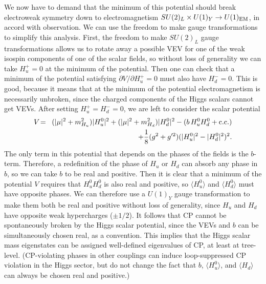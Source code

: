 \documentclass[12pt]{article}
\def\beq{\begin{eqnarray}}
\def\eeq{\end{eqnarray}}
\def\conj{{{\rm c.c.}}}
\begin{document}
We now have to demand that the minimum of this potential should break 
electroweak symmetry down to electromagnetism $SU(2)_L\times U(1)_Y 
\rightarrow U(1)_{\rm EM}$, in accord with observation. We can use the 
freedom to make gauge transformations to simplify this analysis. First, 
the freedom to make $SU(2)_L$ gauge transformations allows us to rotate 
away a possible VEV for one of the weak isospin components of one of the 
scalar fields, so without loss of generality we can take $H_u^+=0$ at the 
minimum of the potential. Then one can check that a minimum of the potential 
satisfying $\partial V/\partial H_u^+=0$ must also have $H_d^- = 0$. This 
is good, because it means that at the minimum of the potential 
electromagnetism is necessarily unbroken, since the charged components of 
the Higgs scalars cannot get VEVs. After setting $H_u^+=H_d^-=0$, we are 
left to consider the scalar potential
\beq
V \!&=&\!
(|\mu|^2 + m^2_{H_u}) |H_u^0|^2 + (|\mu|^2 + m^2_{H_d}) |H_d^0|^2
- (b\, H_u^0 H_d^0 + \conj)
\nonumber \\ && 
+ {1\over 8} (g^2 + g^{\prime 2}) ( |H_u^0|^2 - |H_d^0|^2 )^2 .
\label{littlehiggsv}
\eeq
The only term in this potential that depends on the phases of the fields 
is the $b$-term. Therefore, a redefinition of the phase of $H_u$ or $H_d$ 
can absorb any phase in $b$, so we can take $b$ to be real and positive. 
Then it is clear that a minimum of the potential $V$ requires that $H_u^0 
H_d^0$ is also real and positive, so $\langle H_u^0\rangle$ and $\langle 
H_d^0\rangle$ must have opposite phases. We can therefore use a $U(1)_Y$ 
gauge transformation to make them both be real and positive without loss 
of generality, since $H_u$ and $H_d$ have opposite weak hypercharges ($\pm 
1/2$). It follows that CP cannot be spontaneously broken by the Higgs 
scalar potential, since the VEVs and $b$ can be simultaneously chosen 
real, as a convention. This implies that the Higgs scalar mass eigenstates 
can be assigned well-defined eigenvalues of CP, at least at tree-level. 
(CP-violating phases in other couplings can induce loop-suppressed CP 
violation in the Higgs sector, but do not change the fact that $b$, 
$\langle H_u^0 \rangle$, 
and $\langle H_d \rangle$ can always be chosen real and positive.)
\end{document}
